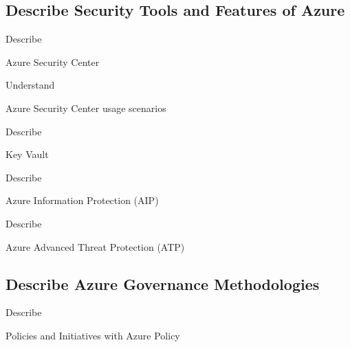 \documentclass{scrartcl}
\newenvironment{flashcard}[2][]{%
    #1
    \vfill
    \centerline{\Large{#2}}
    \vfill
    \newpage
}
{\newpage}
\newcommand{\subsectioncard}[1]{
    \vspace*{\stretch{1}}
    \subsection{#1}
    \vspace*{\stretch{1}}
    \pagebreak
}
\begin{document}
    \subsectioncard{Describe Security Tools and Features of Azure}

    \begin{flashcard}[Describe]{Azure Security Center}

    \end{flashcard}

    \begin{flashcard}[Understand]{Azure Security Center usage scenarios}

    \end{flashcard}

    \begin{flashcard}[Describe]{Key Vault}

    \end{flashcard}

    \begin{flashcard}[Describe]{Azure Information Protection (AIP)}

    \end{flashcard}

    \begin{flashcard}[Describe]{Azure Advanced Threat Protection (ATP)}

    \end{flashcard}

    \subsectioncard{Describe Azure Governance Methodologies}

    \begin{flashcard}[Describe]{Policies and Initiatives with Azure Policy}

    \end{flashcard}
\end{document}

